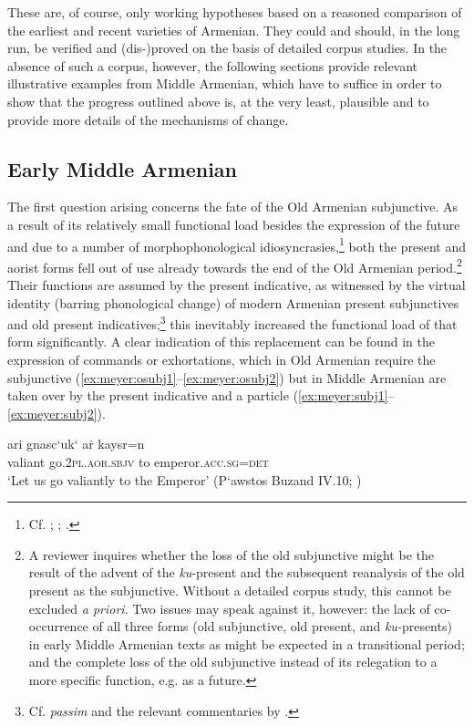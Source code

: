 \documentclass[output=paper,colorlinks,citecolor=brown]{langscibook}
\begin{document}
	These are, of course, only working hypotheses based on a reasoned comparison of the earliest and recent varieties of Armenian. They could and should, in the long run, be verified and (dis-)proved on the basis of detailed corpus studies. In the absence of such a corpus, however, the following sections provide relevant illustrative examples from Middle Armenian, which have to suffice in order to show that the progress outlined above is, at the very least, plausible and to provide more details of the mechanisms of change.
	
	\subsection{Early Middle Armenian}\label{sec:meyer:emarm}
	
	The first question arising concerns the fate of the Old Armenian subjunctive. As a result of its relatively small functional load besides the expression of the future and due to a number of morphophonological idiosyncrasies,\footnote{Cf. \citet[299]{Karst1901}; \citet{Weitenberg1993}; \citet{Vaux1995}.}
	both the present and aorist forms fell out of use already towards the end of the Old Armenian period.\footnote{A reviewer inquires whether the loss of the old subjunctive might be the result of the advent of the \textit{ku}-present and the subsequent reanalysis of the old present as the subjunctive. Without a detailed corpus study, this cannot be excluded \textit{a priori}. Two issues may speak against it, however: the lack of co-occurrence of all three forms (old subjunctive, old present, and \textit{ku-}presents) in early Middle Armenian texts as might be expected in a transitional period; and the complete loss of the old subjunctive instead of its relegation to a more specific function, e.g. as a future.} Their functions are assumed by the present indicative, as witnessed by the virtual identity (barring phonological change) of modern Armenian present subjunctives and old present indicatives;\footnote{Cf. \citet{Acarean1911} \textit{passim} and the relevant commentaries by \citet{DolatianAdjarianfthc}.} this inevitably increased the functional load of that form significantly. A clear indication of this replacement can be found in the expression of commands or exhortations, which in Old Armenian require the subjunctive (\ref{ex:meyer:osubj1}–\ref{ex:meyer:osubj2}) but in Middle Armenian are taken over by the present indicative and a particle (\ref{ex:meyer:subj1}–\ref{ex:meyer:subj2}).
	
	\ea \label{ex:meyer:osubj1}
	\gll ari gnasc‘uk‘ aṙ kaysr=n\\
	valiant go.\textsc{2pl.aor.sbjv} to emperor.\textsc{acc.sg=det}\\
	\glt ‘Let us go valiantly to the Emperor’ (P‘awstos Buzand IV.10; \citealt{Matenagirk1})
	\z {}
	
\end{document}
